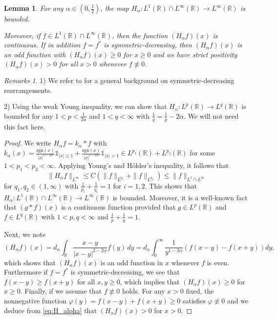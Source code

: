 \documentclass[reqno,10pt,a4paper]{amsart}
\newtheorem{lem}{Lemma}[section]
\theoremstyle{definition}
\theoremstyle{definition}
\theoremstyle{remark}
\theoremstyle{remark}
\newtheorem*{remarks*}{Remarks}
\numberwithin{equation}{section}
\newcommand{\R}{\mathbb{R}}
\newcommand{\be}{\begin{equation}}
\newcommand{\ee}{\end{equation}}
\newcommand{\sgn}{\mathrm{sgn}}
\renewcommand{\phi}{\varphi}
\begin{document}
\begin{lem} \label{lem:H_a}
For any $\alpha \in (0, \frac{1}{2})$, the map $H_\alpha : L^1(\R) \cap L^\infty(\R) \to  L^\infty(\R)$ is bounded. 

Moreover, if $f \in L^1(\R) \cap L^\infty(\R)$, then the function $(H_\alpha f )(x)$ is continuous. If in addition $f=f^*$ is symmetric-decreasing, then $(H_\alpha f)(x)$ is an odd function with $(H_\alpha f)(x) \geq 0$ for $x \geq 0$ and we have strict positivity $(H_\alpha f)(x) > 0$ for all $x > 0$ whenever $f \not \equiv 0$.
\end{lem}

\begin{remarks*}
1) We refer to \cite{LiLo-01} for a general background on symmetric-decreasing rearrangements.

2) Using the weak Young inequality, we can show that $H_\alpha : L^p(\R) \to L^q(\R)$ is bounded for any $1 < p < \frac{1}{2 \alpha}$ and $1 < q < \infty$ with $\frac{1}{q} = \frac{1}{p} - 2 \alpha$. We will not need this fact here.
\end{remarks*}

\begin{proof}
We write $H_\alpha f = k_\alpha \ast f$ with $k_\alpha(x) =  \frac{\sgn(x)}{|x|^{1-2 \alpha}} \mathds{1}_{|x| \leq 1} + \frac{\sgn(x)}{|x|^{1-2 \alpha}} \mathds{1}_{|x| > 1} \in L^{p_1}(\R) + L^{p_2}(\R)$ for some $1 < p_1 < p_2  <\infty$.  Applying Young's and H\"older's inequality, it follows that 
$$
\| H_\alpha f \|_{L^\infty} \leq C \left ( \| f \|_{L^{q_1}} + \| f \|_{L^{q_2}} \right ) \leq \| f \|_{L^1 \cap L^\infty}
$$
for $q_1, q_2 \in (1, \infty)$ with $\frac{1}{p_i} + \frac{1}{q_i} =1$ for $i=1,2$. This shows that $H_\alpha : L^1(\R) \cap L^\infty(\R) \to L^\infty(\R)$ is bounded. Moreover, it is a well-known fact that $(g \ast f)(x)$ is a continuous function provided that $g \in L^p(\R)$ and $f \in L^q(\R)$ with $1 < p,q < \infty$ and $\frac{1}{p} + \frac{1}{q}=1$.

Next, we note
\be \label{eq:H_alpha}
 (H_\alpha f)(x) = d_\alpha \int_\mathbb{R} \frac{x-y}{|x-y|^{2-2\alpha}} f(y) \, dy = d_\alpha \int_0^\infty \frac{1}{y^{1-2 \alpha}} \left(f(x-y)-f(x+y)\right) dy,
\ee
 which shows that $(H_\alpha f)(x)$ is an odd function in $x$ whenever $f$ is even. Furthermore if $f=f^*$ is symmetric-decreasing, we see that $f(x-y)\geq f(x+y)$ for all $x,y\geq 0$, which implies that $(H_\alpha f)(x) \geq 0$ for $x \geq 0$. Finally, if we assume that $f \not \equiv 0$ holds. For any $x > 0$ fixed, the nonnegative function $\phi(y) = f(x-y) + f(x+y) \geq 0$ satisfies $\phi \not \equiv 0$ and we deduce from \eqref{eq:H_alpha} that $(H_\alpha f)(x) > 0$ for $x > 0$.
\end{proof}
\end{document}
